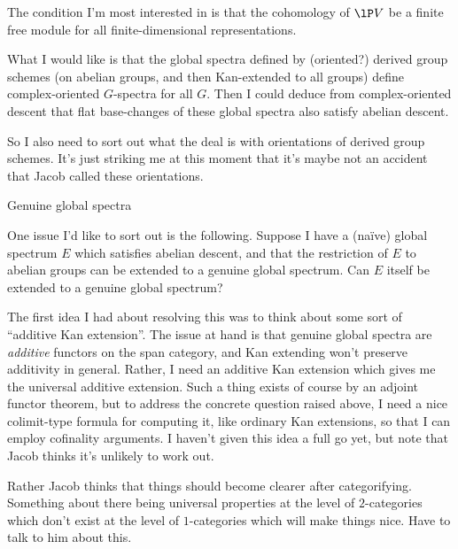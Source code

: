 \begin{ideas}
  \begin{ideas}
  \item The condition I'm most interested in is that the cohomology of
    $\lP V$ be a finite free module for all finite-dimensional
    representations.
  \item What I would like is that the global spectra defined by
    (oriented?) derived group schemes (on abelian groups, and then
    Kan-extended to all groups) define complex-oriented $G$-spectra
    for all $G$. Then I could deduce from complex-oriented descent
    that flat base-changes of these global spectra also satisfy
    abelian descent.
  \item So I also need to sort out what the deal is with orientations
    of derived group schemes. It's just striking me at this moment
    that it's maybe not an accident that Jacob called these
    orientations.
  \end{ideas}


\item Genuine global spectra

  \begin{ideas}
  \item One issue I'd like to sort out is the following. Suppose I
    have a (na\"ive) global spectrum $E$ which satisfies abelian
    descent, and that the restriction of $E$ to abelian groups can be
    extended to a genuine global spectrum. Can $E$ itself be extended
    to a genuine global spectrum?

    \begin{ideas}
      \item The first idea I had about resolving this was to think
        about some sort of ``additive Kan extension''. The issue at
        hand is that genuine global spectra are \emph{additive}
        functors on the span category, and Kan extending won't
        preserve additivity in general. Rather, I need an additive Kan
        extension which gives me the universal additive
        extension. Such a thing exists of course by an adjoint functor
        theorem, but to address the concrete question raised above, I
        need a nice colimit-type formula for computing it, like
        ordinary Kan extensions, so that I can employ cofinality
        arguments. I haven't given this idea a full go yet, but note
        that Jacob thinks it's unlikely to work out.

      \item Rather Jacob thinks that things should become clearer
        after categorifying. Something about there being universal
        properties at the level of $2$-categories which don't exist at
        the level of $1$-categories which will make things nice. Have
        to talk to him about this.
    \end{ideas}
    

\end{ideas}
\end{ideas}
